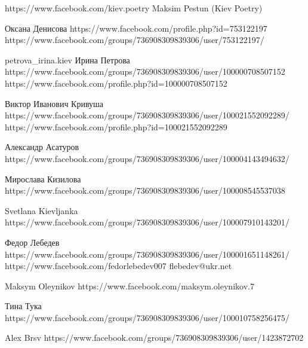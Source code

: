  
 
 
 
 

https://www.facebook.com/kiev.poetry
Maksim Pestun (Kiev Poetry)

Оксана Денисова
https://www.facebook.com/profile.php?id=753122197
https://www.facebook.com/groups/736908309839306/user/753122197/

petrova_irina.kiev
Ирина Петрова
https://www.facebook.com/groups/736908309839306/user/100000708507152
https://www.facebook.com/profile.php?id=100000708507152

Виктор Иванович Кривуша
https://www.facebook.com/groups/736908309839306/user/100021552092289/
https://www.facebook.com/profile.php?id=100021552092289

Александр Асатуров
https://www.facebook.com/groups/736908309839306/user/100004143494632/

Мирослава Кизилова
https://www.facebook.com/groups/736908309839306/user/100008545537038

Svetlana Kievljanka
https://www.facebook.com/groups/736908309839306/user/100007910143201/

Федор Лебедев
https://www.facebook.com/groups/736908309839306/user/100001651148261/
https://www.facebook.com/fedorlebedev007
flebedev@ukr.net

Maksym Oleynikov
https://www.facebook.com/maksym.oleynikov.7

Тина Тука
https://www.facebook.com/groups/736908309839306/user/100010758256475/

Alex Brsv
https://www.facebook.com/groups/736908309839306/user/1423872702
